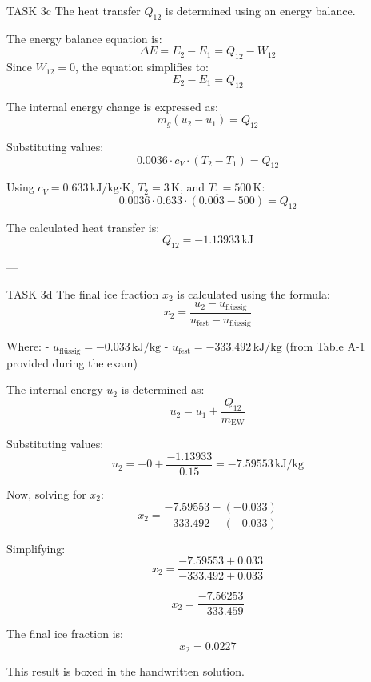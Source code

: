 TASK 3c  
The heat transfer \( Q_{12} \) is determined using an energy balance.  

The energy balance equation is:  
\[
\Delta E = E_2 - E_1 = Q_{12} - W_{12}
\]  
Since \( W_{12} = 0 \), the equation simplifies to:  
\[
E_2 - E_1 = Q_{12}
\]  

The internal energy change is expressed as:  
\[
m_g (u_2 - u_1) = Q_{12}
\]  

Substituting values:  
\[
0.0036 \cdot c_V \cdot (T_2 - T_1) = Q_{12}
\]  

Using \( c_V = 0.633 \, \text{kJ/kg·K} \), \( T_2 = 3 \, \text{K} \), and \( T_1 = 500 \, \text{K} \):  
\[
0.0036 \cdot 0.633 \cdot (0.003 - 500) = Q_{12}
\]  

The calculated heat transfer is:  
\[
Q_{12} = -1.13933 \, \text{kJ}
\]  

---

TASK 3d  
The final ice fraction \( x_2 \) is calculated using the formula:  
\[
x_2 = \frac{u_2 - u_{\text{flüssig}}}{u_{\text{fest}} - u_{\text{flüssig}}}
\]  

Where:  
- \( u_{\text{flüssig}} = -0.033 \, \text{kJ/kg} \)  
- \( u_{\text{fest}} = -333.492 \, \text{kJ/kg} \) (from Table A-1 provided during the exam)  

The internal energy \( u_2 \) is determined as:  
\[
u_2 = u_1 + \frac{Q_{12}}{m_{\text{EW}}}
\]  

Substituting values:  
\[
u_2 = -0 + \frac{-1.13933}{0.15} = -7.59553 \, \text{kJ/kg}
\]  

Now, solving for \( x_2 \):  
\[
x_2 = \frac{-7.59553 - (-0.033)}{-333.492 - (-0.033)}
\]  

Simplifying:  
\[
x_2 = \frac{-7.59553 + 0.033}{-333.492 + 0.033}
\]  

\[
x_2 = \frac{-7.56253}{-333.459}
\]  

The final ice fraction is:  
\[
x_2 = 0.0227
\]  

This result is boxed in the handwritten solution.